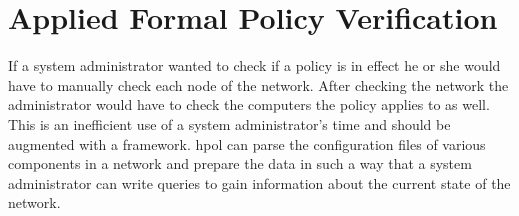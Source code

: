 \documentclass[12pt,letterpaper]{report}
\begin{document}

\chapter{Applied Formal Policy Verification}
\label{Chapter:PolicyQuerying}

If a system administrator wanted to check if a policy is in effect he or she would have to manually check each node of the network. After checking the network the administrator would have to check the computers the policy applies to as well. This is an inefficient use of a system administrator's time and should be augmented with a framework. %
\ac{hpol} can parse the configuration files of various components in a network and prepare the data in such a way that a system administrator can write queries to gain information about the current state of the network. 



\end{document}
